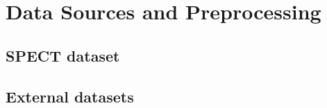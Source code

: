 \section{Data Sources and Preprocessing}
\label{sec:data}

\subsection{SPECT dataset}
\label{subsec:spect_dataset}

\subsection{External datasets}
\label{subsec:external_dataset}